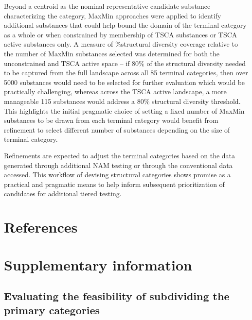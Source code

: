 \documentclass[
  super,
  preprint,
  3p]{elsarticle}
\begin{document}
Beyond a centroid as the nominal representative candidate substance
characterizing the category, MaxMin approaches were applied to identify
additional substances that could help bound the domain of the terminal
category as a whole or when constrained by membership of TSCA substances
or TSCA active substances only. A measure of \%structural diversity
coverage relative to the number of MaxMin substances selected was
determined for both the unconstrained and TSCA active space -- if 80\%
of the structural diversity needed to be captured from the full
landscape across all 85 terminal categories, then over 5000 substances
would need to be selected for further evaluation which would be
practically challenging, whereas across the TSCA active landscape, a
more manageable 115 substances would address a 80\% structural diversity
threshold. This highlights the initial pragmatic choice of setting a
fixed number of MaxMin substances to be drawn from each terminal
category would benefit from refinement to select different number of
substances depending on the size of terminal category.

Refinements are expected to adjust the terminal categories based on the
data generated through additional NAM testing or through the
conventional data accessed. This workflow of devising structural
categories shows promise as a practical and pragmatic means to help
inform subsequent prioritization of candidates for additional tiered
testing.

\hypertarget{references}{%
\section*{References}\label{references}}

\renewcommand{\bibsection}{}


\newpage{}

\newpage
\appendix
\renewcommand{\thefigure}{A\arabic{figure}}
\renewcommand{\thetable}{A\arabic{table}}
\setcounter{figure}{0}
\setcounter{table}{0}

\hypertarget{supplementary-information}{%
\section{Supplementary information}\label{supplementary-information}}

\hypertarget{sec-supp}{%
\subsection{Evaluating the feasibility of subdividing the primary
categories}\label{sec-supp}}
\end{document}
